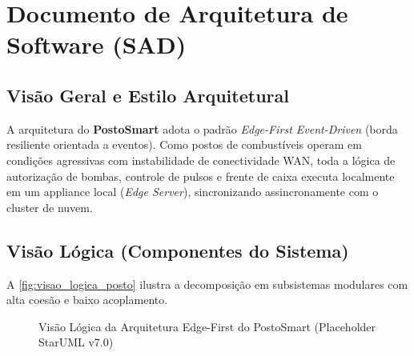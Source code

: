 
\chapter{Documento de Arquitetura de Software (SAD)}
\label{cap:arquitetura_software}

\section{Visão Geral e Estilo Arquitetural}

A arquitetura do \textbf{PostoSmart} adota o padrão \textit{Edge-First Event-Driven} (borda resiliente orientada a eventos). Como postos de combustíveis operam em condições agressivas com instabilidade de conectividade WAN, toda a lógica de autorização de bombas, controle de pulsos e frente de caixa executa localmente em um appliance local (\textit{Edge Server}), sincronizando assincronamente com o cluster de nuvem.

\section{Visão Lógica (Componentes do Sistema)}

A \autoref{fig:visao_logica_posto} ilustra a decomposição em subsistemas modulares com alta coesão e baixo acoplamento.

\begin{figure}[htbp]
    \centering
    \caption{Visão Lógica da Arquitetura Edge-First do PostoSmart (Placeholder StarUML v7.0)}
    \label{fig:visao_logica_posto}
\end{figure}

